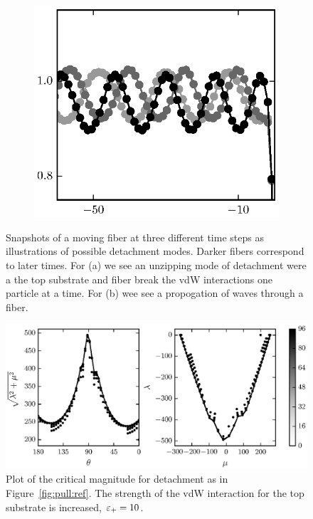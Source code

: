 \begin{figure}[t]
\begin{subfigure}{.5\textwidth}
         \includegraphics{./fig/ch3/pull/wave_anim.eps}
         \caption{\label{subfig:travel_waves}}
      \end{subfigure}
      \caption{Snapshots of a moving fiber at three different time steps as illustrations of possible detachment modes. Darker fibers correspond to later times. For (a) we see an unzipping mode of detachment were a the top substrate and fiber break the vdW interactions one particle at a time. For (b) wee see a propogation of waves through a fiber.\label{fig:animation}}  
   \end{figure}

   \begin{figure}[t]
      \begin{center}
         \includegraphics{./fig/ch3/pull/et10/grid.eps}
      \end{center}      
      \caption{Plot of the critical magnitude for detachment as in Figure~\ref{fig:pull:ref}. The strength of the vdW interaction for the top substrate is increased, $\varepsilon_+=10$.
      \label{fig:pull:et10}}
   \end{figure}

